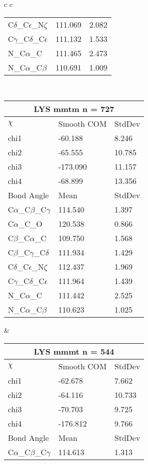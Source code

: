 \begin{longtable}{ c c }
\begin{tabular}{ l l l }
  C$\delta$\_C$\epsilon$\_N$\zeta$ & 111.069 & 2.082\\
  C$\gamma$\_C$\delta$\_C$\epsilon$ & 111.132 & 1.533\\
  N\_C$\alpha$\_C & 111.465 & 2.473\\
  N\_C$\alpha$\_C$\beta$ & 110.691 & 1.009\\
  \bottomrule
  \end{tabular}
  \\
  \begin{tabular}{ l l l }
  \toprule
  \multicolumn{3}{c}{LYS \textbf{mmtm} n = 727} \\ \toprule
  $\chi$       & Smooth COM & StdDev \\ \midrule
  chi1 & -60.188 & 8.246 \\ 
  chi2 & -65.555 & 10.785 \\ 
  chi3 & -173.090 & 11.157 \\ 
  chi4 & -68.899 & 13.356 \\ \midrule
  Bond Angle   & Mean     & StdDev \\ \midrule
  C$\alpha$\_C$\beta$\_C$\gamma$ & 114.540 & 1.397\\
  C$\alpha$\_C\_O & 120.538 & 0.866\\
  C$\beta$\_C$\alpha$\_C & 109.750 & 1.568\\
  C$\beta$\_C$\gamma$\_C$\delta$ & 111.934 & 1.429\\
  C$\delta$\_C$\epsilon$\_N$\zeta$ & 112.437 & 1.969\\
  C$\gamma$\_C$\delta$\_C$\epsilon$ & 111.964 & 1.439\\
  N\_C$\alpha$\_C & 111.442 & 2.525\\
  N\_C$\alpha$\_C$\beta$ & 110.623 & 1.025\\
  \bottomrule
  \end{tabular}
  &
  \begin{tabular}{ l l l }
  \toprule
  \multicolumn{3}{c}{LYS \textbf{mmmt} n = 544} \\ \toprule
  $\chi$       & Smooth COM & StdDev \\ \midrule
  chi1 & -62.678 & 7.662 \\ 
  chi2 & -64.116 & 10.733 \\ 
  chi3 & -70.703 & 9.725 \\ 
  chi4 & -176.812 & 9.766 \\ \midrule
  Bond Angle   & Mean     & StdDev \\ \midrule
  C$\alpha$\_C$\beta$\_C$\gamma$ & 114.613 & 1.313\\

\end{tabular}
\end{longtable}
